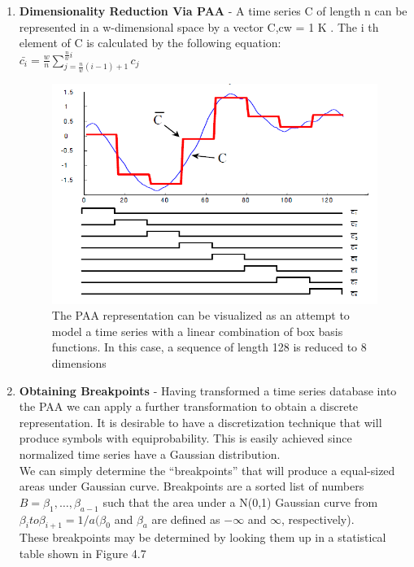 \documentclass[12pt,a4paper]{report}
\begin{document}
\begin{enumerate}
\item{\textbf{Dimensionality Reduction Via PAA} - A time series C of length n can be represented in a w-dimensional space by a vector C,cw = 1 K . The i th
element of C is calculated by the following equation:\\
$\bar{c_i} = \frac{w}{n}  \sum_{j=\frac{n}{w}(i-1) + 1}^{\frac{n}{w}i}c_j$

\begin{figure}[h!]
	\centering
		\includegraphics[scale=0.8]{screenshots/sax/paa.png}
		\caption{The PAA representation can be visualized as an
attempt to model a time series with a linear combination of
box basis functions. In this case, a sequence of length 128 is
reduced to 8 dimensions}
\end{figure}
}
\item{\textbf{Obtaining Breakpoints} - Having transformed a time series database into the PAA we can apply a further transformation to obtain a
discrete representation. It is desirable to have a discretization technique that will produce symbols with
equiprobability. This is easily achieved since normalized time series have a Gaussian distribution. \\ 
We can simply determine the
“breakpoints” that will produce a equal-sized areas under Gaussian curve.
Breakpoints are a sorted list of numbers $Β = \beta _1,…,\beta _{a-1}$ such that the area
under a N(0,1) Gaussian curve from $\beta
_i to \beta _{i+1} = 1/a ( \beta _0$ and $\beta _a$ are defined as $-\infty$ and $\infty $, respectively). \\
These breakpoints may be determined by looking them up in a statistical table shown in Figure 4.7

}
\end{enumerate}
\end{document}
